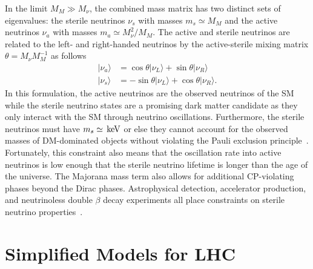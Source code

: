 In the limit $M_M \gg M_\nu$, %
the combined mass matrix has two distinct sets of eigenvalues: the sterile neutrinos $\nu_s$ with masses $m_s \simeq M_M$ and the active neutrinos $\nu_a$ with masses $m_a \simeq M_\nu^2 / M_M$.
The active and sterile neutrinos are related to the left- and right-handed neutrinos by the active-sterile mixing matrix $\theta = M_\nu M_M^{-1}$ as follows
\begin{align}
  | \nu_a \rangle & = \cos \theta | \nu_L \rangle + \sin \theta |\nu_R \rangle \nonumber \\
  | \nu_s \rangle & = - \sin \theta | \nu_L \rangle + \cos \theta |\nu_R \rangle.
\end{align}
In this formulation, the active neutrinos are the observed neutrinos of the SM while the sterile neutrino states are a promising dark matter candidate as they only interact with the SM through neutrino oscillations.
Furthermore, the sterile neutrinos must have $m_s \simeq \,\text{ke\hspace{-.08em}V}$ or else they cannot account for the observed masses of DM-dominated objects without violating the Pauli exclusion principle~\cite{Boyarsky2009}.
Fortunately, this constraint also means that the oscillation rate into active neutrinos is low enough that the sterile neutrino lifetime is longer than the age of the universe.
The Majorana mass term also allows for additional CP-violating phases beyond the Dirac phases.
Astrophysical detection, accelerator production, and neutrinoless double $\beta$ decay experiments all place constraints on sterile neutrino properties~\cite{Boyarsky2019}.

\section{Simplified Models for LHC}
\label{sec:dm_simp}

